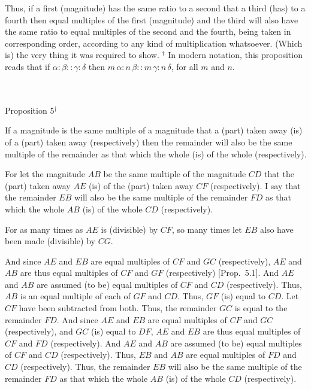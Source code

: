 Thus, if a first (magnitude) has the same ratio to a second 
that a third  (has) to a fourth then equal multiples of the first (magnitude) and the third will also have the same ratio to equal multiples of the second and the fourth,  being taken in corresponding order, according to any kind of
multiplication whatsoever. (Which is) the very thing
it was required to show.
{\footnotesize \noindent$^\dag$ In modern notation, this
proposition reads that if $\alpha:\beta :: \gamma:\delta$ then
$m\,\alpha:n\,\beta::m\,\gamma:n\,\delta$, for all $m$ and $n$.}\\~\\~\\


\begin{center}
{\large Proposition 5}$^\dag$
\end{center}

If a magnitude is the same multiple of a magnitude
that a (part) taken away (is) of a (part) taken away (respectively) then the remainder will
also be the same multiple of the remainder as that  which the whole (is) of the whole (respectively).

\epsfysize=0.7in
\centerline{}

For let the magnitude $AB$ be the same multiple of the magnitude $CD$ that
the (part)  taken away $AE$ (is) of the (part)  taken away $CF$ (respectively).
I say that the remainder $EB$ will also be the same multiple
of the remainder $FD$ as that which the whole $AB$ (is) of the whole
$CD$ (respectively).

For as many times as $AE$ is (divisible) by $CF$, so many times let $EB$
also have been made (divisible) by $CG$.

And since $AE$ and $EB$ are equal multiples of $CF$ and $GC$ (respectively),
$AE$ and $AB$ are thus equal multiples of $CF$ and $GF$ (respectively) 
 [Prop.~5.1]. And  $AE$ and $AB$ are assumed (to be) equal multiples of $CF$ and $CD$ (respectively). Thus,
 $AB$ is an equal multiple of each of $GF$ and $CD$. Thus, $GF$ (is) equal to
 $CD$. Let $CF$ have been subtracted from both. Thus, the remainder $GC$ is
 equal to the remainder $FD$. And since $AE$ and $EB$ are equal multiples
 of $CF$ and $GC$ (respectively), and $GC$ (is) equal to $DF$, $AE$  and $EB$ are thus
 equal multiples of $CF$ and $FD$ (respectively). And $AE$ and $AB$ are assumed
 (to be) equal multiples of $CF$ and $CD$ (respectively). Thus, $EB$ and $AB$ are
 equal multiples of $FD$ and $CD$ (respectively). Thus, the remainder
 $EB$ will also be the same multiple of the remainder $FD$
 as that which the whole $AB$ (is) of the whole $CD$ (respectively).
 
